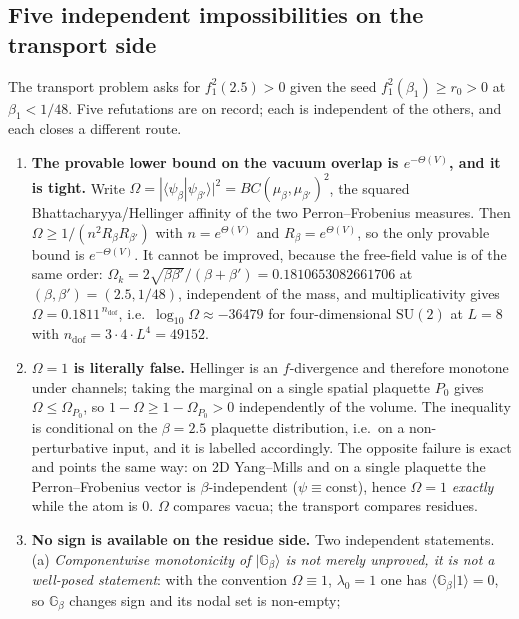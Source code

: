 \subsection{Five independent impossibilities on the transport side}
\label{sec:ng-transport}

The transport problem asks for $f_1^2(2.5)>0$ given the seed $f_1^2(\beta_1)\ge r_0>0$ at
$\beta_1<1/48$. Five refutations are on record; each is independent of the others, and each closes a
different route.

\begin{enumerate}[label=(\roman*)]
\item \textbf{The provable lower bound on the vacuum overlap is $e^{-\Theta(V)}$, and it is tight.}
  \LT{} Write $\Omega=|\langle\psi_\beta|\psi_{\beta'}\rangle|^2=BC(\mu_\beta,\mu_{\beta'})^2$, the
  squared Bhattacharyya/Hellinger affinity of the two Perron--Frobenius measures. Then
  $\Omega\ge1/(n^2R_\beta R_{\beta'})$ with $n=e^{\Theta(V)}$ and $R_\beta=e^{\Theta(V)}$, so the only
  provable bound is $e^{-\Theta(V)}$. It cannot be improved, because the free-field value is of the
  same order: $\Omega_k=2\sqrt{\beta\beta'}/(\beta+\beta')=0.1810653082661706$ at
  $(\beta,\beta')=(2.5,1/48)$, independent of the mass, and multiplicativity gives
  $\Omega=0.1811^{\,n_{\mathrm{dof}}}$, i.e.\ $\log_{10}\Omega\approx-36479$ for four-dimensional
  $\mathrm{SU}(2)$ at $L=8$ with $n_{\mathrm{dof}}=3\cdot4\cdot L^4=49152$.
\item \textbf{$\Omega=1$ is literally false.} \LC{} Hellinger is an $f$-divergence and therefore
  monotone under channels; taking the marginal on a single spatial plaquette $P_0$ gives
  $\Omega\le\Omega_{P_0}$, so $1-\Omega\ge1-\Omega_{P_0}>0$ independently of the volume. The
  inequality is conditional on the $\beta=2.5$ plaquette distribution, i.e.\ on a non-perturbative
  input, and it is labelled accordingly. The opposite failure is exact and points the same way: on
  2D Yang--Mills and on a single plaquette the Perron--Frobenius vector is $\beta$-independent
  ($\psi\equiv\mathrm{const}$), hence $\Omega=1$ \emph{exactly} while the atom is $0$. $\Omega$
  compares vacua; the transport compares residues.
\item \textbf{No sign is available on the residue side.} \LT{} Two independent statements.
  (a) \emph{Componentwise monotonicity of $|\mathbb G_\beta\rangle$ is not merely unproved, it is not a
  well-posed statement}: with the convention $\Omega\equiv1$, $\lambda_0=1$ one has
  $\langle\mathbb G_\beta|1\rangle=0$, so $\mathbb G_\beta$ changes sign and its nodal set is non-empty;

\end{enumerate}
